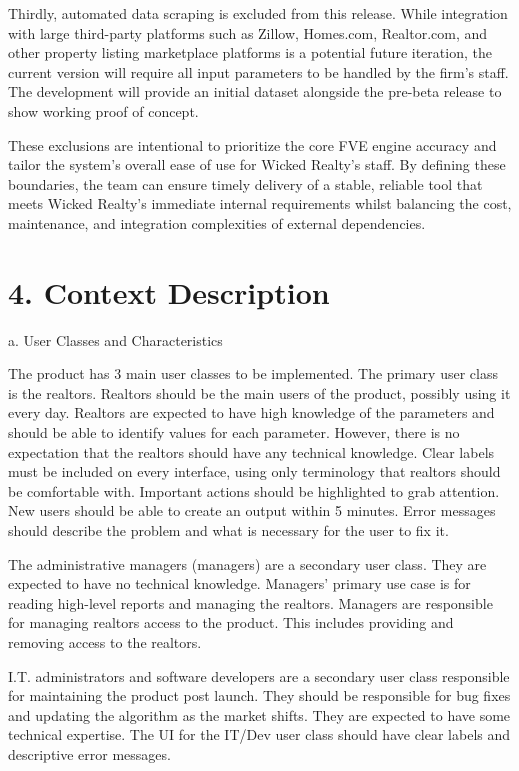 Thirdly, automated data scraping is excluded from this release. While
integration with large third-party platforms such as Zillow, Homes.com,
Realtor.com, and other property listing marketplace platforms is a
potential future iteration, the current version will require all input
parameters to be handled by the firm's staff. The development will
provide an initial dataset alongside the pre-beta release to show
working proof of concept.

These exclusions are intentional to prioritize the core FVE engine
accuracy and tailor the system's overall ease of use for Wicked Realty's
staff. By defining these boundaries, the team can ensure timely delivery
of a stable, reliable tool that meets Wicked Realty's immediate internal
requirements whilst balancing the cost, maintenance, and integration
complexities of external dependencies.

\hypertarget{context-description}{%
\section{4. Context Description}\label{context-description}}

a. User Classes and Characteristics

The product has 3 main user classes to be implemented. The primary user
class is the realtors. Realtors should be the main users of the product,
possibly using it every day. Realtors are expected to have high
knowledge of the parameters and should be able to identify values for
each parameter. However, there is no expectation that the realtors
should have any technical knowledge. Clear labels must be included on
every interface, using only terminology that realtors should be
comfortable with. Important actions should be highlighted to grab
attention. New users should be able to create an output within 5
minutes. Error messages should describe the problem and what is
necessary for the user to fix it.

The administrative managers (managers) are a secondary user class. They
are expected to have no technical knowledge. Managers' primary use case
is for reading high-level reports and managing the realtors. Managers
are responsible for managing realtors\textquotesingle{} access to the
product. This includes providing and removing access to the realtors.

I.T. administrators and software developers are a secondary user class
responsible for maintaining the product post launch. They should be
responsible for bug fixes and updating the algorithm as the market
shifts. They are expected to have some technical expertise. The UI for
the IT/Dev user class should have clear labels and descriptive error
messages.

